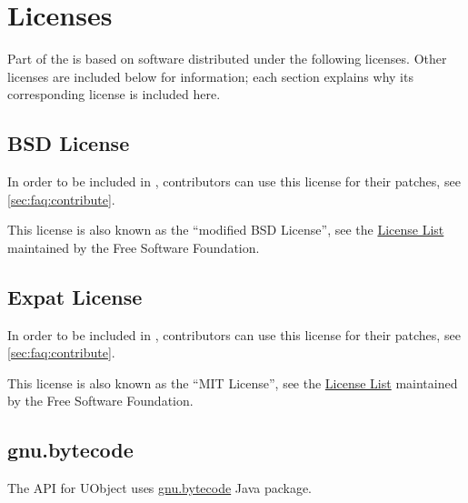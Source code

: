 
\chapter{Licenses}
\label{sec:licenses}

\newcommand{\inputLicense}[1]
{%
}

Part of the \usdk is based on software distributed under the following
licenses.  Other licenses are included below for information; each section
explains why its corresponding license is included here.


\section{BSD License}
\label{sec:license:bsd}
In order to be included in \usdk, contributors can use this license for
their patches, see \autoref{sec:faq:contribute}.

This license is also known as the ``modified BSD License'', see the
\href{http://www.gnu.org/licenses/license-list.html}{License List}
maintained by the Free Software Foundation.

\inputLicense{bsd}

\section{Expat License}
\label{sec:license:expat}
In order to be included in \usdk, contributors can use this license for
their patches, see \autoref{sec:faq:contribute}.

This license is also known as the ``MIT License'', see the
\href{http://www.gnu.org/licenses/license-list.html}{License List}
maintained by the Free Software Foundation.

\inputLicense{expat}

\section{gnu.bytecode}
\label{sec:license:gnu.bytecode}
The \Java API for UObject uses
\href{http://www.gnu.org/software/kawa/api/gnu/bytecode/package-summary.html}{gnu.bytecode}
Java package.

